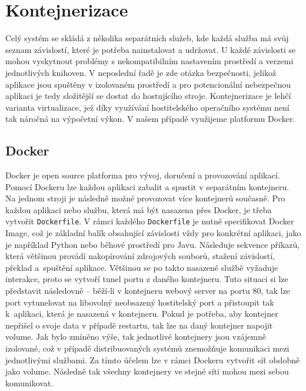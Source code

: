 \newpage
\section{Kontejnerizace}
Celý systém se skládá z několika separátních služeb, kde každá služba má svůj seznam závislostí, které je potřeba nainstalovat a udržovat. U každé závislosti se mohou vyskytnout problémy s nekompatibilním nastavením prostředí a verzemi jednotlivých knihoven. V neposlední řadě je zde otázka bezpečnosti, jelikož aplikace jsou spuštěny v izolovaném prostředí a pro potencionální nebezpečnou aplikaci je tedy složitější se dostat do hostujícího stroje. Kontejnerizace je lehčí varianta virtualizace, jež díky využívání hostitelského operačního systému není tak náročná na výpočetní výkon. V našem případě využijeme platformu Docker.

\subsection{Docker}
Docker \cite{dockerOverview} je open source platforma pro vývoj, doručení a provozování aplikací. Pomocí Dockeru lze každou aplikaci zabalit a spustit v separátním kontejneru. Na jednom stroji je následně možné provozovat více kontejnerů současně. Pro každou aplikaci nebo službu, která má být nasazena přes Docker, je třeba vytvořit \texttt{Dockerfile}. V rámci každého \texttt{Dockerfile} je nutné specifikovat Docker Image, což je základní balík obsahující závislosti vždy pro konkrétní aplikaci, jako je například Python nebo běhové prostředí pro Javu. Následuje sekvence příkazů, která většinou provádí nakopírování zdrojových souborů, stažení závislostí, překlad a~spuštění aplikace. Většinou se po takto nasazené službě vyžaduje interakce, proto se vytvoří tunel portu z daného kontejneru. Tuto situaci si lze představit následovně – běží-li v kontejneru webový server na portu 80, tak lze port vytunelovat na libovolný neobsazený hostitelský port a přistoupit tak k~aplikaci, která je nasazená v kontejneru. Pokud je potřeba, aby kontejner nepřišel o svoje data v případě restartu, tak lze na daný kontejner napojit volume. Jak bylo zmíněno výše, tak jednotlivé kontejnery jsou vzájemně izolované, což v případě distribuovaných systémů znemožňuje komunikaci mezi jednotlivými službami. Za tímto účelem lze v rámci Dockeru vytvořit síť obdobně jako volume. Následně tak všechny kontejnery ve stejné síti mohou mezi sebou komunikovat.

